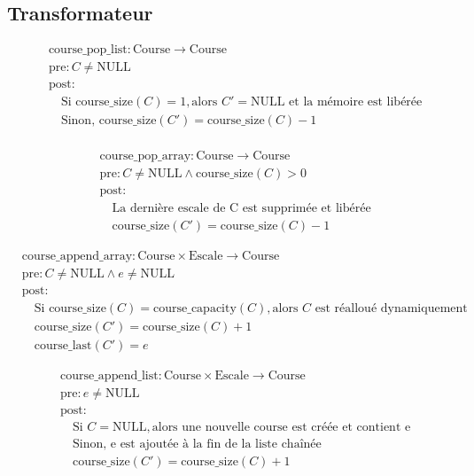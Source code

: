 \subsection{Transformateur}

\[
\begin{aligned}
&\text{course\_pop\_list}: \text{Course} \to \text{Course} \\
&\text{pre}: C \neq \text{NULL} \\
&\text{post}: \\
&\quad \text{Si } \text{course\_size}(C) = 1, \text{alors } C' = \text{NULL} \text{ et la mémoire est libérée} \\
&\quad \text{Sinon, } \text{course\_size}(C') = \text{course\_size}(C) - 1 \\
\end{aligned}
\]

\[
\begin{aligned}
&\text{course\_pop\_array}: \text{Course} \to \text{Course} \\
&\text{pre}: C \neq \text{NULL} \land \text{course\_size}(C) > 0 \\
&\text{post}: \\
&\quad \text{La dernière escale de C est supprimée et libérée} \\
&\quad \text{course\_size}(C') = \text{course\_size}(C) - 1
\end{aligned}
\]



\[
\begin{aligned}
&\text{course\_append\_array}: \text{Course} \times \text{Escale} \to \text{Course} \\
&\text{pre}: C \neq \text{NULL} \land e \neq \text{NULL} \\
&\text{post}: \\
&\quad \text{Si } \text{course\_size}(C) = \text{course\_capacity}(C), \text{alors } C \text{ est réalloué dynamiquement} \\
&\quad \text{course\_size}(C') = \text{course\_size}(C) + 1 \\
&\quad \text{course\_last}(C') = e
\end{aligned}
\]


\[
\begin{aligned}
&\text{course\_append\_list}: \text{Course} \times \text{Escale} \to \text{Course} \\
&\text{pre}: e \neq \text{NULL} \\
&\text{post}: \\
&\quad \text{Si } C = \text{NULL}, \text{alors une nouvelle course est créée et contient e} \\
&\quad \text{Sinon, e est ajoutée à la fin de la liste chaînée} \\
&\quad \text{course\_size}(C') = \text{course\_size}(C) + 1
\end{aligned}
\]

